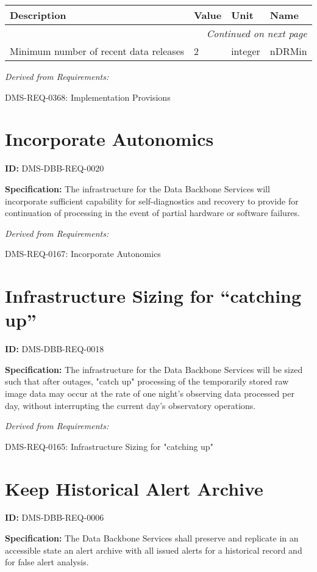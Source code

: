 \documentclass[SE,toc,lsstdraft]{lsstdoc}
\makeatletter
\newcommand{\paramname}[1]{\hspace{0pt}#1}
\newcommand{\unitname}[1]{\hspace{0pt}#1}
\newenvironment{parameters}[0]{%
\setlength\LTleft{0pt}
\setlength\LTright{\fill}
\begin{small}
\begin{longtable}[]{|p{0.49\textwidth}|l|p{0.6in}|p{1.70in}@{}|}

\hline \textbf{Description} & \textbf{Value} & \textbf{Unit} & \textbf{Name} \\ \hline
\endhead

\hline \multicolumn{4}{r}{\emph{Continued on next page}} \\
\endfoot

\hline\hline
\endlastfoot
}{%
\hline
\end{longtable}
\end{small}
}
\makeatother
\begin{document}
\begin{parameters}
Minimum number of recent data releases
&
2
&
\unitname{%
integer
}
&
\paramname{%
nDRMin
} \\\hline
\end{parameters}

\emph{Derived from Requirements:}

DMS-REQ-0368:
Implementation Provisions \newline

\section{Incorporate Autonomics}

\label{DMS-DBB-REQ-0020}
\textbf{ID:} DMS-DBB-REQ-0020

\textbf{Specification:}
The infrastructure for the Data Backbone Services will incorporate sufficient capability for self-diagnostics and recovery to provide for continuation of processing in the event of partial hardware or software failures.

\emph{Derived from Requirements:}

DMS-REQ-0167:
Incorporate Autonomics \newline

\section{Infrastructure Sizing for “catching up”}

\label{DMS-DBB-REQ-0018}
\textbf{ID:} DMS-DBB-REQ-0018

\textbf{Specification:}
The infrastructure for the Data Backbone Services will be sized such that after outages, "catch up" processing of the temporarily stored raw image data may occur at the rate of one night’s observing data processed per day, without interrupting the current day's observatory operations.

\emph{Derived from Requirements:}

DMS-REQ-0165:
Infrastructure Sizing for "catching up" \newline

\section{Keep Historical Alert Archive}

\label{DMS-DBB-REQ-0006}
\textbf{ID:} DMS-DBB-REQ-0006

\textbf{Specification:}
The Data Backbone Services shall preserve and replicate in an accessible state an alert archive with all issued alerts for a historical record and for false alert analysis.
\end{document}
